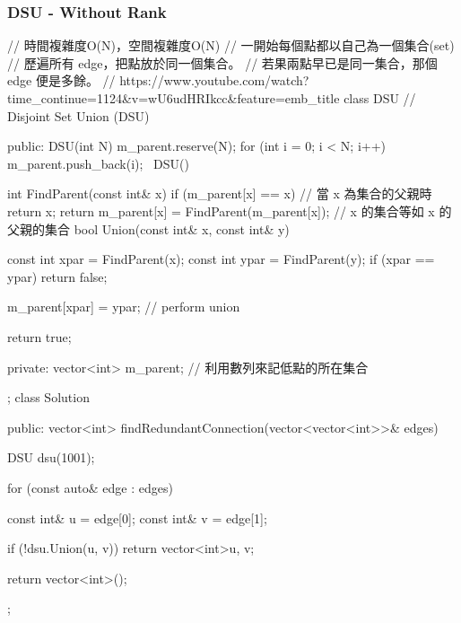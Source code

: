 \subsubsection{DSU - Without Rank}
\begin{Code}
// 時間複雜度O(N)，空間複雜度O(N)
// 一開始每個點都以自己為一個集合(set)
// 歷遍所有 edge，把點放於同一個集合。
// 若果兩點早已是同一集合，那個 edge 便是多餘。
// https://www.youtube.com/watch?time_continue=1124&v=wU6udHRIkcc&feature=emb_title
class DSU // Disjoint Set Union (DSU)
{
public:
    DSU(int N)
    {
        m_parent.reserve(N);
        for (int i = 0; i < N; i++) m_parent.push_back(i);
    }
    ~DSU() {}

    int FindParent(const int& x)
    {
        if (m_parent[x] == x) // 當 x 為集合的父親時
            return x;
        return m_parent[x] = FindParent(m_parent[x]); // x 的集合等如 x 的父親的集合
    }
    bool Union(const int& x, const int& y)
    {
        const int xpar = FindParent(x);
        const int ypar = FindParent(y);
        if (xpar == ypar) return false;

        m_parent[xpar] = ypar; // perform union

        return true;
    }
private:
    vector<int> m_parent; // 利用數列來記低點的所在集合
};
class Solution
{
public:
    vector<int> findRedundantConnection(vector<vector<int>>& edges) {
        DSU dsu(1001);

        for (const auto& edge : edges)
        {
            const int& u = edge[0];
            const int& v = edge[1];

            if (!dsu.Union(u, v))
                return vector<int>{u, v};
        }

        return vector<int>();
    }
};
\end{Code}

